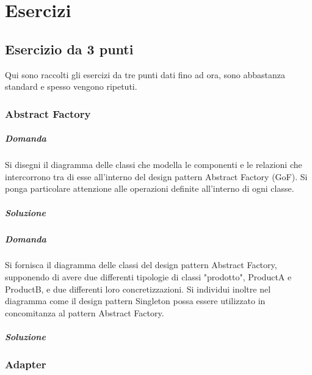 \chapter{Esercizi}

\section{Esercizio da 3 punti}
Qui sono raccolti gli esercizi da tre punti dati fino ad ora, sono abbastanza standard e spesso vengono ripetuti.

\subsection{Abstract Factory}

\paragraph{Domanda}

Si disegni il diagramma delle classi che modella le componenti e le relazioni che intercorrono tra di esse all'interno del design pattern Abstract Factory (GoF). Si ponga particolare attenzione alle operazioni definite all'interno di ogni classe.

\paragraph{Soluzione}

\paragraph{Domanda}

Si fornisca il diagramma delle classi del design pattern Abstract Factory, supponendo di avere due differenti tipologie di classi "prodotto", ProductA e ProductB, e due differenti loro concretizzazioni. Si individui inoltre nel diagramma come il design pattern Singleton possa essere utilizzato in concomitanza al pattern Abstract Factory.

\paragraph{Soluzione}


\subsection{Adapter}

